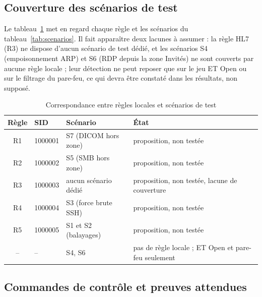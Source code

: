 \subsection{Couverture des scénarios de test}

Le tableau~\ref{tab:couverture} met en regard chaque règle et les scénarios du tableau~\ref{tab:scenarios}. Il fait apparaître deux lacunes à assumer : la règle HL7 (R3) ne dispose d'aucun scénario de test dédié, et les scénarios S4 (empoisonnement ARP) et S6 (RDP depuis la zone Invités) ne sont couverts par aucune règle locale ; leur détection ne peut reposer que sur le jeu ET Open ou sur le filtrage du pare-feu, ce qui devra être constaté dans les résultats, non supposé.

\begin{table}[htbp]
\centering
\small
\begin{tabularx}{\textwidth}{cllX}
\hline
\textbf{Règle} & \textbf{SID} & \textbf{Scénario} & \textbf{État} \\
\hline
R1 & 1000001 & S7 (DICOM hors zone) & proposition, non testée \\
R2 & 1000002 & S5 (SMB hors zone) & proposition, non testée \\
R3 & 1000003 & aucun scénario dédié & proposition, non testée, lacune de couverture \\
R4 & 1000004 & S3 (force brute SSH) & proposition, non testée \\
R5 & 1000005 & S1 et S2 (balayages) & proposition, non testée \\
-- & -- & S4, S6 & pas de règle locale ; ET Open et pare-feu seulement \\
\hline
\end{tabularx}
\caption{Correspondance entre règles locales et scénarios de test}
\label{tab:couverture}
\end{table}

\subsection{Commandes de contrôle et preuves attendues}

